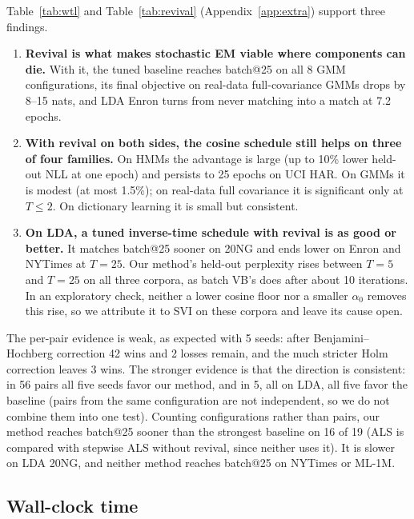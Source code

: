 \documentclass[10pt]{article}
\begin{document}
Table~\ref{tab:wtl} and Table~\ref{tab:revival} (Appendix~\ref{app:extra}) support three findings.
\begin{enumerate}[nosep]
  \item \textbf{Revival is what makes stochastic EM viable where components can die.} With it, the tuned baseline
        reaches batch@25 on all 8 GMM configurations, its final objective on real-data full-covariance GMMs drops by
        8--15 nats, and LDA Enron turns from never matching into a match at 7.2 epochs.
  \item \textbf{With revival on both sides, the cosine schedule still helps on three of four families.} On HMMs the
        advantage is large (up to 10\% lower held-out NLL at one epoch) and persists to 25 epochs on UCI HAR. On
        GMMs it is modest (at most 1.5\%); on real-data full covariance it is significant only at $T \le 2$. On
        dictionary learning it is small but consistent.
  \item \textbf{On LDA, a tuned inverse-time schedule with revival is as good or better.} It matches batch@25 sooner
        on 20NG and ends lower on Enron and NYTimes at $T = 25$. Our method's held-out perplexity rises between $T =
        5$ and $T = 25$ on all three corpora, as batch VB's does after about 10 iterations. In an exploratory check,
        neither a lower cosine floor nor a smaller $\alpha_0$ removes this rise, so we attribute it to SVI on these
        corpora and leave its cause open.
\end{enumerate}
The per-pair evidence is weak, as expected with 5 seeds: after Benjamini--Hochberg correction 42 wins and 2 losses
remain, and the much stricter Holm correction leaves 3 wins. The stronger evidence is that the direction is
consistent: in 56 pairs all five seeds favor our method, and in 5, all on LDA, all five favor the baseline (pairs from
the same configuration are not independent, so we do not combine them into one test). Counting configurations
rather than pairs, our method reaches batch@25 sooner than the strongest baseline on 16 of 19 (ALS is compared with
stepwise ALS without revival, since neither uses it). It is slower on LDA 20NG, and neither method reaches batch@25 on
NYTimes or ML-1M.

\subsection{Wall-clock time}\label{sec:res-wall}
\end{document}
